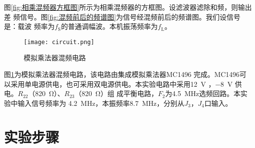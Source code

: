 \documentclass[../main]{subfiles}
\begin{document}
图\ref{fig:相乘混频器方框图}所示为相乘混频器的方框图。设滤波器滤除和频，则输出差
频信号。图\ref{fig:混频前后的频谱图}为信号经混频前后的频谱图。我们设信号是：载波
频率为$ f_\mathrm{S} $的普通调幅波。本机振荡频率为$ f_\mathrm{L} $。

\begin{figure}[htbp]
	\centering
	\texttt{[image: circuit.png]}
	\caption{模拟乘法器混频电路}
	\label{fig:模拟乘法器混频电路}
\end{figure}

图\ref{fig:模拟乘法器混频电路}为模拟乘法器混频电路，该电路由集成模拟乘法器MC1496
完成。MC1496可以采用单电源供电，也可采用双电源供电。本实验电路中采用\SI{+12}{\V}
，\SI{-8}{\V} 供电。$ R_{22} $（\SI{820}{\ohm}）、$ R_{23} $（\SI{820}{\ohm}）组
成平衡电路，$ F_2 $为\SI{4.5}{\MHz}选频回路。本实验中输入信号频率为
\SI{4.2}{\MHz}，本振频率\SI{8.7}{\MHz}，分别从$ J_3 $，$ J_4 $口输入。

\section{实验步骤}%
\label{sec:\arabic{chapter}实验步骤}
\end{document}
